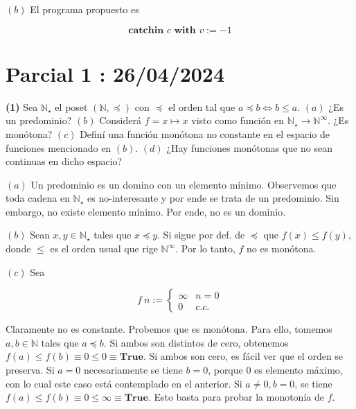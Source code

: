 \documentclass[a4paper, 12pt]{article}
\begin{document}
$(b)$ El programa propuesto es 

\begin{equation*}
  \textbf{catchin } c \textbf{ with } v := -1
\end{equation*}

\pagebreak 

\section{Parcial 1 : 26/04/2024}

\begin{myframe}
  \textbf{(1)} Sea $\mathbb{N}_\star$ el poset $(\mathbb{N}, \preceq)$ con $\preceq$
  el orden tal que $a \preceq b \iff b \leq a$. $(a)$ ¿Es un predominio? $(b)$ Considerá $f = x \mapsto x$
  visto como función en $\mathbb{N}_\star \to \mathbb{N}^\infty$. ¿Es monótona? 
  $(c)$ Definí una función monótona no constante en el espacio de funciones
  mencionado en $(b)$. $(d)$ ¿Hay funciones monótonas que no sean continuas en
  dicho espacio?
\end{myframe}

$(a)$ Un predominio es un domino con un elemento mínimo. Observemos que toda
cadena en $\mathbb{N}_\star$ es no-interesante y por ende se trata de un
predominio. Sin embargo, no existe elemento mínimo. Por ende, no es un dominio.



$(b)$ Sean $x, y \in \mathbb{N}_\star$ tales que $x \preceq y$. Si sigue por
def. de $\preceq$ que $f(x)
\leq f(y)$, donde $\leq$ es el orden usual que rige $\mathbb{N}^\infty$. Por lo
tanto, $f$ no es monótona.

$(c)$ Sea 

\begin{equation*}
  f ~ n := \begin{cases}
    \infty & n = 0 \\ 
    0 & c.c.
  \end{cases}
\end{equation*}

Claramente no es constante. Probemos que es monótona. Para ello, tomemos $a, b
\in \mathbb{N}$ tales que $a \preceq b$. Si ambos son distintos de cero,
obtenemos $f(a) \leq f(b) \equiv 0 \leq 0 \equiv \textbf{True}$. Si ambos son
cero, es fácil ver que el orden se preserva. Si $a = 0$ necesariamente se tiene
$b = 0$, porque $0$ es elemento máximo, con lo cual este caso está contemplado
en el anterior. Si $a \neq 0, b = 0$, se tiene $f(a) \leq f(b) \equiv 0 \leq
\infty \equiv \textbf{True}$. Esto basta para probar la monotonía de $f$.
\end{document}
